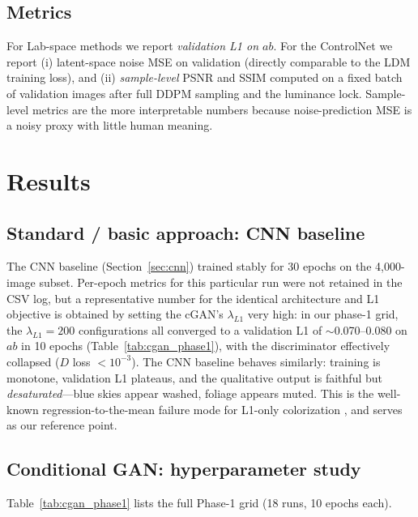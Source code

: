 \documentclass[conference]{IEEEtran}
\begin{document}
\subsection{Metrics}
For Lab-space methods we report \emph{validation L1 on $ab$}. For the
ControlNet we report (i) latent-space noise MSE on validation
(directly comparable to the LDM training loss), and (ii)
\emph{sample-level} PSNR and SSIM \cite{wang2004image} computed on a
fixed batch of validation images after full DDPM sampling and the
luminance lock. Sample-level metrics are the more interpretable
numbers because noise-prediction MSE is a noisy proxy with little
human meaning.

\section{Results}\label{sec:results}

\subsection{Standard / basic approach: CNN baseline}\label{sec:res-cnn}
The CNN baseline (Section~\ref{sec:cnn}) trained stably for 30 epochs
on the 4{,}000-image subset. Per-epoch metrics for this particular run
were not retained in the CSV log, but a representative number for the
identical architecture and L1 objective is obtained by setting the
cGAN's $\lambda_{L1}$ very high: in our phase-1 grid, the
$\lambda_{L1}=200$ configurations all converged to a validation
L1 of $\sim$0.070--0.080 on $ab$ in 10 epochs
(Table~\ref{tab:cgan_phase1}), with the discriminator effectively
collapsed ($D$ loss $<\!10^{-3}$). The CNN baseline behaves similarly:
training is monotone, validation L1 plateaus, and the qualitative
output is faithful but \emph{desaturated}---blue skies appear washed,
foliage appears muted. This is the well-known regression-to-the-mean
failure mode for L1-only colorization \cite{zhang2016colorful}, and
serves as our reference point.

\subsection{Conditional GAN: hyperparameter study}
Table~\ref{tab:cgan_phase1} lists the full Phase-1 grid (18 runs, 10
epochs each).
\end{document}

